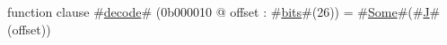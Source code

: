 function clause #\hyperref[zdecode]{decode}# (0b000010 @ offset : #\hyperref[zbits]{bits}#(26)) =
  #\hyperref[zSome]{Some}#(#\hyperref[zJ]{J}#(offset))
